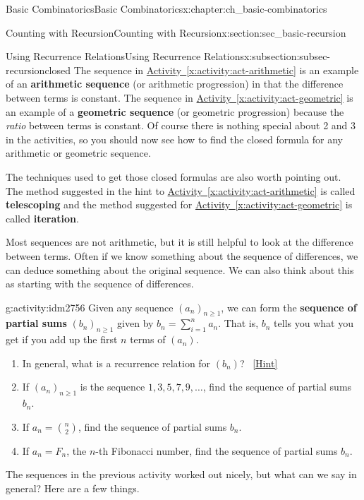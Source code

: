 \documentclass[oneside,10pt,]{book}
\newcommand{\terminology}[1]{\textbf{#1}}
\numberwithin{equation}{chapter}
\begin{document}
\begin{chapterptx}{Basic Combinatorics}{}{Basic Combinatorics}{}{}{x:chapter:ch_basic-combinatorics}
\begin{sectionptx}{Counting with Recursion}{}{Counting with Recursion}{}{}{x:section:sec_basic-recursion}
\begin{subsectionptx}{Using Recurrence Relations}{}{Using Recurrence Relations}{}{}{x:subsection:subsec-recursionclosed}
The sequence in \hyperref[x:activity:act-arithmetic]{Activity~\ref{x:activity:act-arithmetic}} is an example of an \terminology{arithmetic sequence} (or arithmetic progression) in that the difference between terms is constant.  The sequence in \hyperref[x:activity:act-geometric]{Activity~\ref{x:activity:act-geometric}} is an example of a \terminology{geometric sequence} (or geometric progression) because the \emph{ratio} between terms is constant.  Of course there is nothing special about 2 and 3 in the activities, so you should now see how to find the closed formula for any arithmetic or geometric sequence.%
\par
The techniques used to get those closed formulas are also worth pointing out.  The method suggested in the hint to \hyperref[x:activity:act-arithmetic]{Activity~\ref{x:activity:act-arithmetic}} is called \terminology{telescoping} and the method suggested for \hyperref[x:activity:act-geometric]{Activity~\ref{x:activity:act-geometric}} is called \terminology{iteration}.%
\par
Most sequences are not arithmetic, but it is still helpful to look at the difference between terms.  Often if we know something about the sequence of differences, we can deduce something about the original sequence.   We can also think about this as starting with the sequence of differences.%
\begin{activity}{}{g:activity:idm2756}%
Given any sequence \((a_n)_{n \ge 1}\), we can form the \terminology{sequence of partial sums} \((b_n)_{n \ge 1}\) given by \(b_n = \sum_{i = 1}^n a_n\).  That is, \(b_n\) tells you what you get if you add up the first \(n\) terms of \((a_n)\).%
\begin{enumerate}[font=\bfseries,label=(\alph*),ref=\alph*]
\item{}In general, what is a recurrence relation for \((b_n)\)?%
\qquad~\hfill{\tiny\hyperlink{g:hint:idm2770-back}{[Hint]}}\item{}If \((a_n)_{n \ge 1}\) is the sequence \(1, 3, 5, 7, 9, \ldots\), find the sequence of partial sums \(b_n\).%
\item{}If \(a_n = \binom{n}{2}\), find the sequence of partial sums \(b_n\).%
\item{}If \(a_n = F_n\), the \(n\)-th Fibonacci number, find the sequence of partial sums \(b_n\).%
\end{enumerate}
\end{activity}
The sequences in the previous activity worked out nicely, but what can we say in general?  Here are a few things.%

\end{subsectionptx}
\end{sectionptx}
\end{chapterptx}
\end{document}

